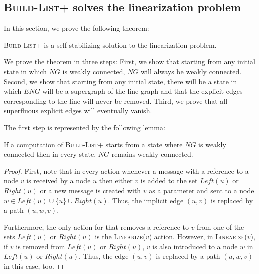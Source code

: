 \documentclass[a4paper,USenglish]{lipics}
\newcommand{\blp}{\textsc{Build-List+}\xspace}
\newcommand{\linearize}[1]{\textsc{Linearize(\ensuremath{#1})}\xspace}
\begin{document}
\subsection{\blp solves the linearization problem}\label{sec:self_stabilization_proof}
In this section, we prove the following theorem:
\begin{theorem}\label{thm:blp_solves_linearization}
 \blp is a self-stabilizing solution to the linearization problem. 
\end{theorem}
We prove the theorem in three steps: 
First, we show that starting from any initial state in which $NG$ is weakly connected, $NG$ will always be weakly connected.
Second, we show that starting from any initial state, there will be a state in which $ENG$ will be a supergraph of the line graph and that the explicit edges corresponding to the line will never be removed.
Third, we prove that all superfluous explicit edges will eventually vanish.


The first step is represented by the following lemma:
\begin{lemma}\label{lem:NG_remains_weakly_connected}
 If a computation of \blp starts from a state where $NG$ is weakly connected then in every state, $NG$ remains weakly connected.
\end{lemma}

\begin{proof}
  First, note that in every action whenever a message with a reference to a node $v$ is received by a node $u$ then either $v$ is added to the set $Left(u)$ or $Right(u)$ or a new message is created with $v$ as a parameter and sent to a node $w \in Left(u) \cup \{u\} \cup Right(u)$.
  Thus, the implicit edge $(u,v)$ is replaced by a path $(u,w,v)$.
  
  Furthermore, the only action for that removes a reference to $v$ from one of the sets $Left(u)$ or $Right(u)$ is the \linearize{v} action.
  However, in \linearize{v}, if $v$ is removed from $Left(u)$ or $Right(u)$, $v$ is also introduced to a node $w$ in $Left(u)$ or $Right(u)$.
  Thus, the edge $(u,v)$ is replaced by a path $(u,w,v)$ in this case, too.
\end{proof}
\end{document}
